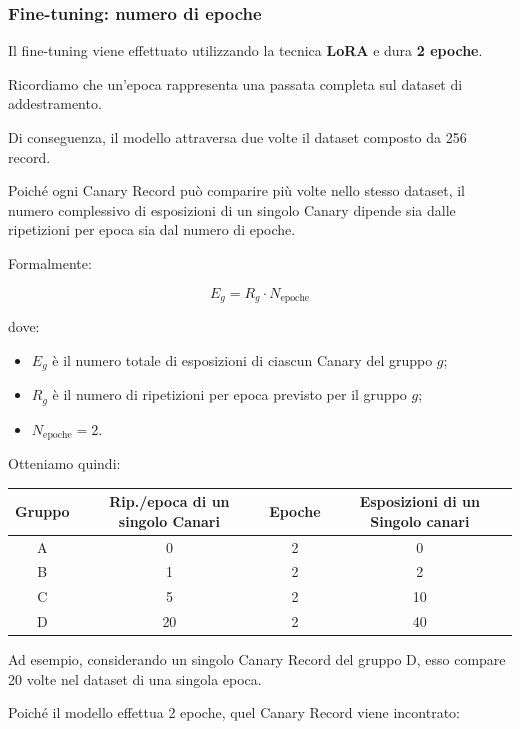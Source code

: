 \subsubsection{Fine-tuning: numero di epoche}

Il fine-tuning viene effettuato utilizzando
la tecnica \textbf{LoRA} e dura
\textbf{2 epoche}.

Ricordiamo che un'epoca rappresenta
una passata completa sul dataset
di addestramento.

Di conseguenza, il modello attraversa
due volte il dataset composto da 256 record.

Poiché ogni Canary Record può comparire
più volte nello stesso dataset,
il numero complessivo di esposizioni
di un singolo Canary dipende sia dalle
ripetizioni per epoca sia dal numero
di epoche.

Formalmente:

\begin{equation}
\boxed{
E_g = R_g \cdot N_{\text{epoche}}
}
\end{equation}

dove:
\begin{itemize}
    \item $E_g$ è il numero totale di esposizioni
    di ciascun Canary del gruppo $g$;
    \item $R_g$ è il numero di ripetizioni
    per epoca previsto per il gruppo $g$;
    \item $N_{\text{epoche}}=2$.
\end{itemize}

Otteniamo quindi:

\begin{center}
\begin{tabular}{|c|c|c|c|}
\hline
\textbf{Gruppo}
& \textbf{Rip./epoca di un singolo Canari}
& \textbf{Epoche}
& \textbf{Esposizioni di un Singolo canari} \\
\hline
A & 0 & 2 & 0 \\
B & 1 & 2 & 2 \\
C & 5 & 2 & 10 \\
D & 20 & 2 & 40 \\
\hline
\end{tabular}
\end{center}

Ad esempio, considerando un singolo
Canary Record del gruppo D, esso compare
20 volte nel dataset di una singola epoca.

Poiché il modello effettua 2 epoche,
quel Canary Record viene incontrato:


